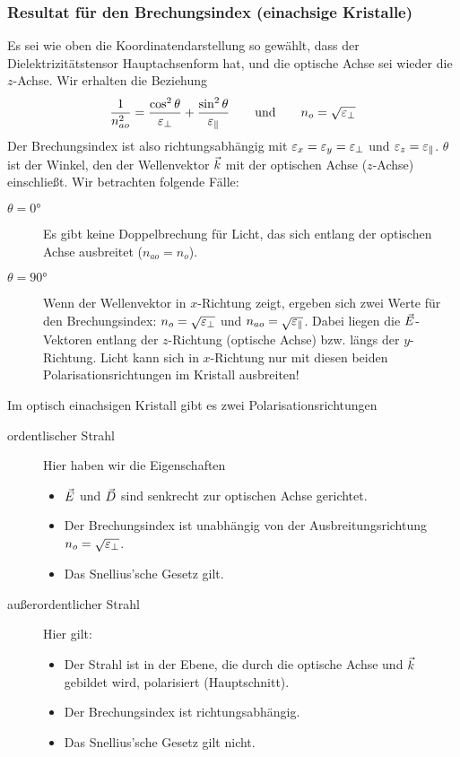 \subsubsection[Resultat für den Brechungsindex]%
{Resultat für den Brechungsindex (einachsige Kristalle)}
Es sei wie oben die Koordinatendarstellung so gewählt, dass der
Dielektrizitätstensor Hauptachsenform hat, und die optische Achse sei
wieder die $z$-Achse. Wir erhalten die Beziehung
\begin{gather*}
  \frac{1}{n_{ao}^2} 
  = \frac{\cos^2\theta}{\varepsilon_\bot} + \frac{\sin^2\theta}{\varepsilon_\parallel}
  \qquad\text{und} \qquad
  n_o = \sqrt{\varepsilon_\bot}
\end{gather*}
Der Brechungsindex ist also richtungsabhängig mit
$\varepsilon_x=\varepsilon_y=\varepsilon_\bot$ und $\varepsilon_z=\varepsilon_\parallel$.
$\theta$ ist der Winkel, den der Wellenvektor $\vec{k}$ mit der optischen
Achse ($z$-Achse) einschließt.
Wir betrachten folgende Fälle:
\begin{description}
\item[$\theta=\ang{0}$] Es gibt keine Doppelbrechung für Licht, das
  sich entlang der optischen Achse ausbreitet ($n_{ao} = n_o$).
\item[$\theta=\ang{90}$] Wenn der Wellenvektor in $x$-Richtung zeigt,
  ergeben sich zwei Werte für den Brechungsindex: 
  $n_o=\sqrt{\varepsilon_\bot}$ und $n_{ao}=\sqrt{\varepsilon_\parallel}$.
  Dabei liegen die $\vec{E}$-Vektoren entlang der $z$-Richtung (optische
  Achse) bzw. längs der $y$-Richtung. Licht kann sich in $x$-Richtung
  nur mit diesen beiden Polarisationsrichtungen im Kristall ausbreiten!
\end{description}
Im optisch einachsigen Kristall gibt es zwei Polarisationsrichtungen
\begin{description}
\item[ordentlischer Strahl] Hier haben wir die Eigenschaften
  \begin{itemize}
  \item $\vec{E}$ und $\vec{D}$ sind senkrecht zur optischen Achse
    gerichtet.
  \item Der Brechungsindex ist unabhängig von der Ausbreitungsrichtung
    $n_o=\sqrt{\varepsilon_\bot}$.
  \item Das Snellius'sche Gesetz gilt.
  \end{itemize}
\item[außerordentlicher Strahl] Hier gilt:
  \begin{itemize}
  \item Der Strahl ist in der Ebene, die durch die optische Achse und
    $\vec{k}$ gebildet wird, polarisiert
    (Hauptschnitt).
  \item Der Brechungsindex ist richtungsabhängig.
  \item Das Snellius'sche Gesetz gilt nicht.
  \end{itemize}
\end{description}

